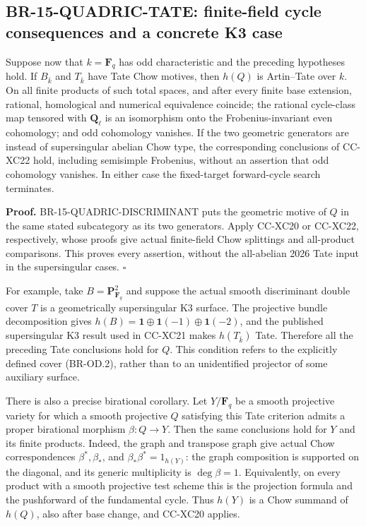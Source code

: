 \subsection{BR-15-QUADRIC-TATE: finite-field cycle consequences and a concrete K3 case}
Suppose now that $k=\mathbf F_q$ has odd characteristic and the
preceding hypotheses hold. If $B_{\bar k}$ and $T_{\bar k}$ have Tate
Chow motives, then $h(Q)$ is Artin--Tate over $k$. On all finite
products of such total spaces, and after every finite base extension,
rational, homological and numerical equivalence coincide; the
rational cycle-class map tensored with $\mathbf Q_\ell$ is an
isomorphism onto the Frobenius-invariant even cohomology; and odd
cohomology vanishes. If the two geometric generators are instead of
supersingular abelian Chow type, the corresponding conclusions of
CC-XC22 hold, including semisimple Frobenius, without an assertion that
odd cohomology vanishes. In either case the fixed-target forward-cycle
search terminates.

\textbf{Proof.} BR-15-QUADRIC-DISCRIMINANT puts the geometric motive of
$Q$ in the same stated subcategory as its two generators. Apply
CC-XC20 or CC-XC22, respectively, whose proofs give actual finite-field
Chow splittings and all-product comparisons. This proves every
assertion, without the all-abelian 2026 Tate input in the supersingular
cases. $\square$

For example, take $B=\mathbf P^2_{\mathbf F_q}$ and suppose the
actual smooth discriminant double cover $T$ is a geometrically
supersingular K3 surface. The projective bundle decomposition gives
$h(B)=\mathbf1\oplus\mathbf1(-1)\oplus\mathbf1(-2)$, and the
published supersingular K3 result used in CC-XC21 makes $h(T_{\bar k})$
Tate. Therefore all the preceding Tate conclusions hold for $Q$.
This condition refers to the explicitly defined cover (BR-OD.2),
rather than to an unidentified projector of some auxiliary surface.

There is also a precise birational corollary. Let $Y/\mathbf F_q$ be a
smooth projective variety for which a smooth projective $Q$ satisfying
this Tate criterion admits a proper birational morphism $\beta:Q\to Y$.
Then the same conclusions hold for $Y$ and its finite products.
Indeed, the graph and transpose graph give actual Chow correspondences
$\beta^*,\beta_*$, and $\beta_*\beta^*=1_{h(Y)}$: the graph
composition is supported on the diagonal, and its generic multiplicity
is $\deg\beta=1$. Equivalently, on every product with a smooth
projective test scheme this is the projection formula and the
pushforward of the fundamental cycle. Thus $h(Y)$ is a Chow summand of
$h(Q)$, also after base change, and CC-XC20 applies.

